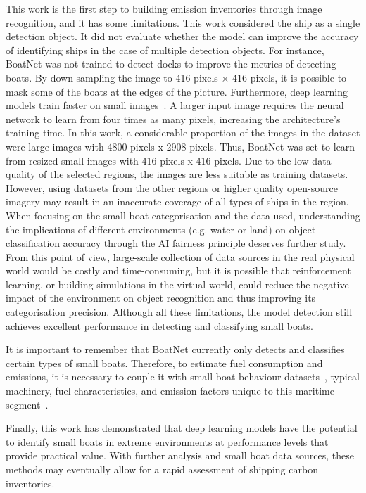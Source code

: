 This work is the first step to building emission inventories through image recognition, and it has some limitations. This work considered the ship as a single detection object. It did not evaluate whether the model can improve the accuracy of identifying ships in the case of multiple detection objects. For instance, BoatNet was not trained to detect docks to improve the metrics of detecting boats. By down-sampling the image to 416 pixels × 416 pixels, it is possible to mask some of the boats at the edges of the picture.
Furthermore, deep learning models train faster on small images~\cite{tan2021efficientnetv2}. A larger input image requires the neural network to learn from four times as many pixels, increasing the architecture's training time. In this work, a considerable proportion of the images in the dataset were large images with 4800 pixels x 2908 pixels. Thus, BoatNet was set to learn from resized small images with 416 pixels x 416 pixels. Due to the low data quality of the selected regions, the images are less suitable as training datasets. However, using datasets from the other regions or higher quality open-source imagery may result in an inaccurate coverage of all types of ships in the region. When focusing on the small boat categorisation and the data used, understanding the implications of different environments (e.g. water or land) on object classification accuracy through the AI fairness principle deserves further study. From this point of view, large-scale collection of data sources in the real physical world would be costly and time-consuming, but it is possible that reinforcement learning, or building simulations in the virtual world, could reduce the negative impact of the environment on object recognition and thus improving its categorisation precision. Although all these limitations, the model detection still achieves excellent performance in detecting and classifying small boats.

It is important to remember that BoatNet currently only detects and classifies certain types of small boats. Therefore, to estimate fuel consumption and emissions, it is necessary to couple it with small boat behaviour datasets~\cite{ferrer2021mexican}, typical machinery, fuel characteristics, and emission factors unique to this maritime segment~\cite{inecc2020inventario}. 

Finally, this work has demonstrated that deep learning models have the potential to identify small boats in extreme environments at performance levels that provide practical value. With further analysis and small boat data sources, these methods may eventually allow for a rapid assessment of shipping carbon inventories.
